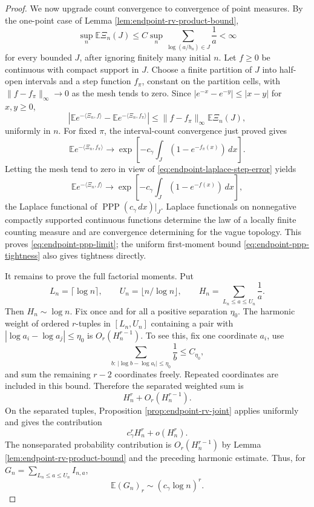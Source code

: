 \documentclass[11pt]{article}
\theoremstyle{remark}
\newcommand{\Ee}{\mathbb E}
\newcommand{\PPP}{\operatorname{PPP}}
\newcommand{\dd}{\,d}
\begin{document}
\begin{proof}
We now upgrade count convergence to convergence of point measures.  By the
one-point case of Lemma \ref{lem:endpoint-rv-product-bound},
\[
        \sup_n\Ee\Xi_n(J)
        \le C\sup_n\sum_{\log(a/b_n)\in J}\frac1a<\infty
\tag{8.48}\label{eq:endpoint-ppp-tightness}
\]
for every bounded \(J\), after ignoring finitely many initial \(n\).  Let
\(f\ge0\) be continuous with compact support in \(J\).  Choose a finite
partition of \(J\) into half-open intervals and a step function \(f_\pi\),
constant on the partition cells, with
\(\|f-f_\pi\|_\infty\to0\) as the mesh tends to zero.  Since
\(|e^{-x}-e^{-y}|\le|x-y|\) for \(x,y\ge0\),
\[
\left|
\Ee e^{-\langle\Xi_n,f\rangle}
-\Ee e^{-\langle\Xi_n,f_\pi\rangle}
\right|
\le\|f-f_\pi\|_\infty\Ee\Xi_n(J),
\tag{8.49}\label{eq:endpoint-laplace-step-error}
\]
uniformly in \(n\).  For fixed \(\pi\), the interval-count convergence just
proved gives
\[
\Ee e^{-\langle\Xi_n,f_\pi\rangle}
\longrightarrow
\exp\left[-c_\gamma\int_J(1-e^{-f_\pi(x)})\dd x\right].
\]
Letting the mesh tend to zero in view of
\eqref{eq:endpoint-laplace-step-error} yields
\[
\Ee e^{-\langle\Xi_n,f\rangle}
\longrightarrow
\exp\left[-c_\gamma\int_J(1-e^{-f(x)})\dd x\right],
\tag{8.50}\label{eq:endpoint-laplace-functional}
\]
the Laplace functional of \(\PPP(c_\gamma\dd x)|_J\).  Laplace functionals
on nonnegative compactly supported continuous functions determine the law of a
locally finite counting measure and are convergence determining for the vague
topology.  This proves \eqref{eq:endpoint-ppp-limit}; the uniform first-moment
bound \eqref{eq:endpoint-ppp-tightness} also gives tightness directly.

It remains to prove the full factorial moments.  Put
\[
        L_n=\lceil\log n\rceil,
        \qquad
        U_n=\lfloor n/\log n\rfloor,
        \qquad
        H_n=\sum_{L_n\le a\le U_n}\frac1a.
\]
Then \(H_n\sim\log n\).  Fix once and for all a positive separation
\(\eta_0\).  The harmonic weight of ordered \(r\)-tuples in
\([L_n,U_n]\) containing a pair with
\(|\log a_i-\log a_j|\le\eta_0\) is \(O_r(H_n^{r-1})\).  To see this, fix
one coordinate \(a_i\), use
\[
        \sum_{b:\,|\log b-\log a_i|\le\eta_0}\frac1b
        \le C_{\eta_0},
\]
and sum the remaining \(r-2\) coordinates freely.  Repeated coordinates are
included in this bound.  Therefore the separated weighted sum is
\[
        H_n^r+O_r(H_n^{r-1}).
\tag{8.51}\label{eq:endpoint-global-separated-weight}
\]
On the separated tuples, Proposition \ref{prop:endpoint-rv-joint} applies
uniformly and gives the contribution
\[
        c_\gamma^rH_n^r+o(H_n^r).
\]
The nonseparated probability contribution is \(O_r(H_n^{r-1})\) by Lemma
\ref{lem:endpoint-rv-product-bound} and the preceding harmonic estimate.
Thus, for
\(G_n=\sum_{L_n\le a\le U_n}I_{n,a}\),
\[
        \Ee(G_n)_r\sim(c_\gamma\log n)^r.
\tag{8.52}\label{eq:endpoint-truncated-factorials}
\]


\end{proof}
\end{document}
